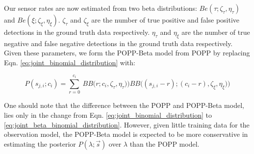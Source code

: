 Our sensor rates are now estimated from two beta distributions: $Be(\tau ; \zeta_{\tau}, \eta_{\tau})$ and $Be(\xi ; \zeta_{\xi}, \eta_{\xi})$.
% 
$\zeta_{\tau}$ and $\zeta_{\xi}$ are the number of true positive and false positive detections in the ground truth data respectively.
% 
$\eta_{\tau}$ and $\eta_{\xi}$ are the number of true negative and false  negative detections in the ground truth data respectively. 
% 
Given these parameters, we form the POPP-Beta model from POPP by replacing Eqn. \ref{eq:joint_binomial_distribution} with:  

\begin{equation}
	\label{eq:joint_beta_binomial_distribution}
    P(s_{j,i} ; c_i) \! = \! \! \! \displaystyle\sum_{r = 0}^{c_{i}} \! \! ~ BB\Big(r ; c_i, \zeta_{\tau}, \eta_{\tau}) \Big) BB\Big( (s_{j,i} - r) ; (c_i - r), \zeta_{\xi}, \eta_{\xi}) \Big)
\end{equation}



One should note that the difference between the POPP and POPP-Beta model, lies only in the change from Eqn. \ref{eq:joint_binomial_distribution} to \ref{eq:joint_beta_binomial_distribution}. However, given little training data for the observation model, the POPP-Beta model is expected to be more conservative in estimating the posterior $P(\lambda ; \vec{s})$ over $\lambda$ than the POPP model. 

